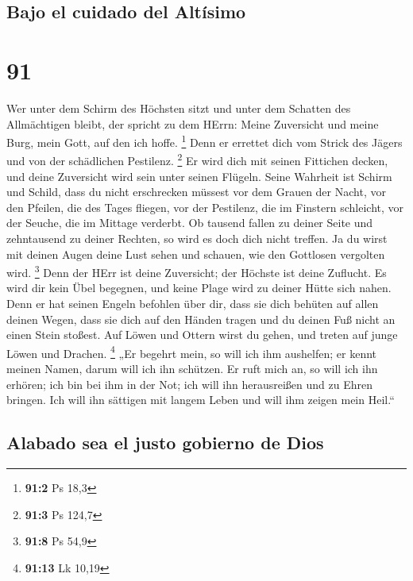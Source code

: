 \hypertarget{bajo-el-cuidado-del-altuxedsimo}{%
\subsection{Bajo el cuidado del
Altísimo}\label{bajo-el-cuidado-del-altuxedsimo}}

\hypertarget{section-90}{%
\section{91}\label{section-90}}

 Wer unter dem Schirm des Höchsten sitzt und unter dem
Schatten des Allmächtigen bleibt,  der spricht zu dem
HErrn: Meine Zuversicht und meine Burg, mein Gott, auf den ich hoffe.
\footnote{\textbf{91:2} Ps 18,3}  Denn er errettet dich
vom Strick des Jägers und von der schädlichen Pestilenz. \footnote{\textbf{91:3}
  Ps 124,7}  Er wird dich mit seinen Fittichen decken, und
deine Zuversicht wird sein unter seinen Flügeln. Seine Wahrheit ist
Schirm und Schild,  dass du nicht erschrecken müssest vor
dem Grauen der Nacht, vor den Pfeilen, die des Tages fliegen,
 vor der Pestilenz, die im Finstern schleicht, vor der
Seuche, die im Mittage verderbt.  Ob tausend fallen zu
deiner Seite und zehntausend zu deiner Rechten, so wird es doch dich
nicht treffen.  Ja du wirst mit deinen Augen deine Lust
sehen und schauen, wie den Gottlosen vergolten wird. \footnote{\textbf{91:8}
  Ps 54,9}  Denn der HErr ist deine Zuversicht; der
Höchste ist deine Zuflucht.  Es wird dir kein Übel
begegnen, und keine Plage wird zu deiner Hütte sich nahen.
 Denn er hat seinen Engeln befohlen über dir, dass sie
dich behüten auf allen deinen Wegen,  dass sie dich auf
den Händen tragen und du deinen Fuß nicht an einen Stein stoßest.
 Auf Löwen und Ottern wirst du gehen, und treten auf
junge Löwen und Drachen. \footnote{\textbf{91:13} Lk 10,19}
 „Er begehrt mein, so will ich ihm aushelfen; er kennt
meinen Namen, darum will ich ihn schützen.  Er ruft mich
an, so will ich ihn erhören; ich bin bei ihm in der Not; ich will ihn
herausreißen und zu Ehren bringen.  Ich will ihn sättigen
mit langem Leben und will ihm zeigen mein Heil.``

\hypertarget{alabado-sea-el-justo-gobierno-de-dios}{%
\subsection{Alabado sea el justo gobierno de
Dios}\label{alabado-sea-el-justo-gobierno-de-dios}}

